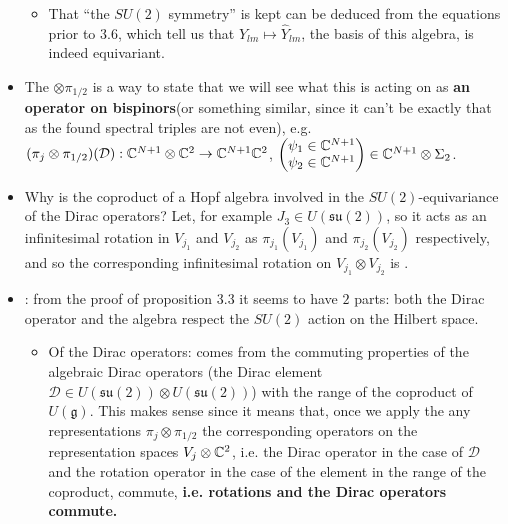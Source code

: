 \documentclass{article}
\newcommand{\alg}[1]{\ensuremath{\mathfrak{#1}}}
\newcommand{\sut}{\ensuremath{\mathfrak{su}(2)}}
\begin{document}
\begin{itemize}
\begin{itemize}
        \item That ``the $SU(2)$ symmetry'' is kept can be deduced from the equations prior to 3.6, which tell us that $Y_{lm} \mapsto \hat Y_{lm}$, the basis of this algebra, is indeed equivariant.
            
        \end{itemize}
        
    \item The $\otimes \pi_{1/2}$ is a way to state that we will see what this is acting on as \textbf{an operator on bispinors}(or something similar, since it can't be exactly that as the found spectral triples are not even), e.g. $(\pi_j \otimes \pi_{1/2})(\mathcal D): \mathbb{C}^{N+1}\otimes \mathbb{C}^2 \to \mathbb{C}^{N+1}\mathbb{C}^2$, $\begin{pmatrix} \psi_1 \in \mathbb{C}^{N+1} \\ \psi_2 \in \mathbb{C}^{N+1} \end{pmatrix} \in \mathbb{C}^{N+1}\otimes \Sigma_2$.
    
    \item Why is the coproduct of a Hopf algebra involved in the $SU(2)$-equivariance of the Dirac operators? Let, for example $J_3 \in U(\sut)$, so it acts as an infinitesimal rotation in $V_{j_1}$ and $V_{j_2}$ as $\pi_{j_1}(V_{j_1})$ and $\pi_{j_2}(V_{j_2})$ respectively, and so the corresponding infinitesimal rotation on $V_{j_1}\otimes V_{j_2}$ is .
    
    \item {}: from the proof of proposition 3.3 it seems to have $2$ parts: both the Dirac operator and the algebra respect the $SU(2)$ action on the Hilbert space.
    
        \begin{itemize}
            
        \item Of the Dirac operators: comes from the commuting properties of the algebraic Dirac operators (the Dirac element $\mathcal D \in U(\sut) \otimes U(\sut)$) with the range of the coproduct of $U(\alg g)$. This makes sense since it means that, once we apply the any representations $\pi_j \otimes \pi_{1/2}$ the corresponding operators on the representation spaces $V_j \otimes \mathbb{C}^2$, i.e. the Dirac operator in the case of $\mathcal D$ and the rotation operator in the case of the element in the range of the coproduct, commute, \textbf{i.e. rotations and the Dirac operators commute.}
            

\end{itemize}
\end{itemize}
\end{document}
